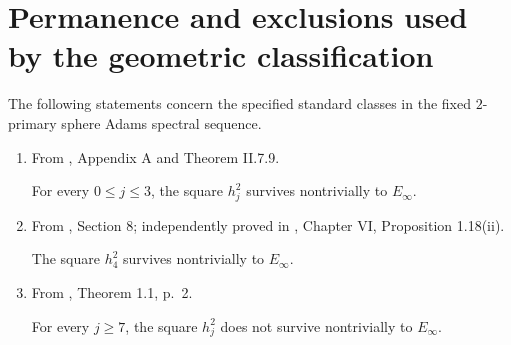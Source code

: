 \section{Permanence and exclusions used by the geometric classification}
\begin{theorem}
\label{frontier:Literature:552cd6818d8d}
The following statements concern the specified standard classes in the fixed
$2$-primary sphere Adams spectral sequence.
\begin{enumerate}
\item From \cite{MayThesis1964}, Appendix A and Theorem II.7.9.\par
For every $0\leq j\leq3$, the square $h_j^2$ survives nontrivially to $E_\infty$.
\item From \cite{MahowaldTangora}, Section 8; independently proved in
\cite{BMMS1986}, Chapter VI, Proposition 1.18(ii).\par
The square $h_4^2$ survives nontrivially to $E_\infty$.
\item From \cite{HHR}, Theorem 1.1, p.~2.\par
For every $j\geq7$, the square $h_j^2$ does not survive nontrivially to $E_\infty$.
\end{enumerate}
\end{theorem}


